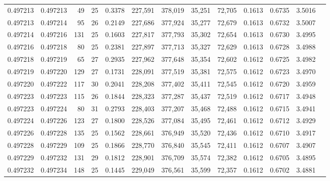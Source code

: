 \begin{tabular}{rrrrrrrrrrrrr}
0.497213 & 0.497213 &  49 &  25 &                                     0.3378 & 227,591 & 378,019 &  35,251 &  72,705 & 0.1613 & 0.6735 & 3.5016 \\
0.497213 & 0.497214 &  95 &  26 &                                     0.2149 & 227,686 & 377,924 &  35,277 &  72,679 & 0.1613 & 0.6732 & 3.5007 \\
0.497214 & 0.497216 & 131 &  25 &                                     0.1603 & 227,817 & 377,793 &  35,302 &  72,654 & 0.1613 & 0.6730 & 3.4995 \\
0.497216 & 0.497218 &  80 &  25 &                                     0.2381 & 227,897 & 377,713 &  35,327 &  72,629 & 0.1613 & 0.6728 & 3.4988 \\
0.497218 & 0.497219 &  65 &  27 &                                     0.2935 & 227,962 & 377,648 &  35,354 &  72,602 & 0.1612 & 0.6725 & 3.4982 \\
0.497219 & 0.497220 & 129 &  27 &                                     0.1731 & 228,091 & 377,519 &  35,381 &  72,575 & 0.1612 & 0.6723 & 3.4970 \\
0.497220 & 0.497222 & 117 &  30 &                                     0.2041 & 228,208 & 377,402 &  35,411 &  72,545 & 0.1612 & 0.6720 & 3.4959 \\
0.497223 & 0.497223 & 115 &  26 &                                     0.1844 & 228,323 & 377,287 &  35,437 &  72,519 & 0.1612 & 0.6717 & 3.4948 \\
0.497223 & 0.497224 &  80 &  31 &                                     0.2793 & 228,403 & 377,207 &  35,468 &  72,488 & 0.1612 & 0.6715 & 3.4941 \\
0.497224 & 0.497226 & 123 &  27 &                                     0.1800 & 228,526 & 377,084 &  35,495 &  72,461 & 0.1612 & 0.6712 & 3.4929 \\
0.497226 & 0.497228 & 135 &  25 &                                     0.1562 & 228,661 & 376,949 &  35,520 &  72,436 & 0.1612 & 0.6710 & 3.4917 \\
0.497228 & 0.497229 & 109 &  25 &                                     0.1866 & 228,770 & 376,840 &  35,545 &  72,411 & 0.1612 & 0.6707 & 3.4907 \\
0.497229 & 0.497232 & 131 &  29 &                                     0.1812 & 228,901 & 376,709 &  35,574 &  72,382 & 0.1612 & 0.6705 & 3.4895 \\
0.497232 & 0.497234 & 148 &  25 &                                     0.1445 & 229,049 & 376,561 &  35,599 &  72,357 & 0.1612 & 0.6702 & 3.4881 \\

\end{tabular}
